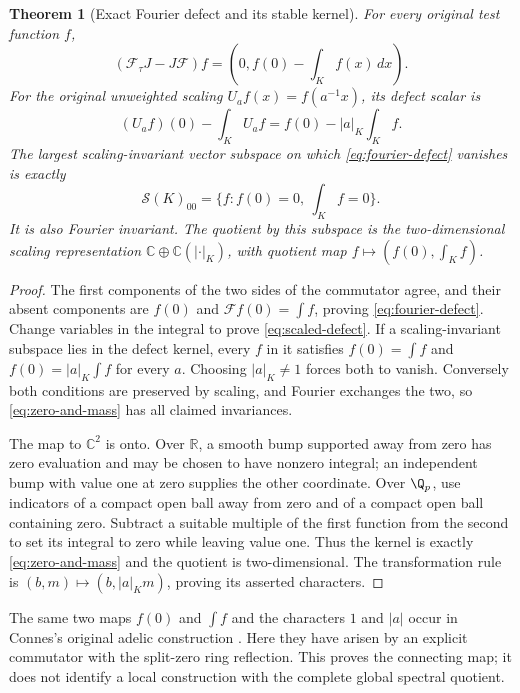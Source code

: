 \documentclass[11pt,a4paper]{article}
\newtheorem{theorem}{Theorem}[section]
\theoremstyle{definition}\newtheorem{definition}[theorem]{Definition}
\newcommand{\C}{\mathbb C}\newcommand{\R}{\mathbb R}
\newcommand{\Sch}{\mathcal S}\newcommand{\im}{\operatorname{im}}
\begin{document}
\begin{theorem}[Exact Fourier defect and its stable kernel]\label{thm:fourier-defect}
For every original test function $f$,
\begin{equation}\label{eq:fourier-defect}
 (\mathcal F_\tau J-J\mathcal F)f
 =\left(0,f(0)-\int_Kf(x)\,dx\right).
\end{equation}
For the original unweighted scaling $U_af(x)=f(a^{-1}x)$, its defect scalar is
\begin{equation}\label{eq:scaled-defect}
 (U_af)(0)-\int_KU_af=f(0)-|a|_K\int_Kf.
\end{equation}
The largest scaling-invariant vector subspace on which \eqref{eq:fourier-defect} vanishes is exactly
\begin{equation}\label{eq:zero-and-mass}
 \Sch(K)_{00}=\{f:f(0)=0,\ \int_Kf=0\}.
\end{equation}
It is also Fourier invariant. The quotient by this subspace is the two-dimensional scaling representation $\C\oplus\C(|\cdot|_K)$, with quotient map $f\mapsto(f(0),\int_Kf)$.
\end{theorem}
\begin{proof}
The first components of the two sides of the commutator agree, and their absent components are $f(0)$ and $\mathcal Ff(0)=\int f$, proving \eqref{eq:fourier-defect}. Change variables in the integral to prove \eqref{eq:scaled-defect}. If a scaling-invariant subspace lies in the defect kernel, every $f$ in it satisfies $f(0)=\int f$ and $f(0)=|a|_K\int f$ for every $a$. Choosing $|a|_K\ne1$ forces both to vanish. Conversely both conditions are preserved by scaling, and Fourier exchanges the two, so \eqref{eq:zero-and-mass} has all claimed invariances.

The map to $\C^2$ is onto. Over $\R$, a smooth bump supported away from zero has zero evaluation and may be chosen to have nonzero integral; an independent bump with value one at zero supplies the other coordinate. Over $\Q_p$, use indicators of a compact open ball away from zero and of a compact open ball containing zero. Subtract a suitable multiple of the first function from the second to set its integral to zero while leaving value one. Thus the kernel is exactly \eqref{eq:zero-and-mass} and the quotient is two-dimensional. The transformation rule is $(b,m)\mapsto(b,|a|_Km)$, proving its asserted characters.
\end{proof}

The same two maps $f(0)$ and $\int f$ and the characters $1$ and $|a|$ occur in Connes's original adelic construction \cite[Section III, (6)--(11)]{Connes1998}. Here they have arisen by an explicit commutator with the split-zero ring reflection. This proves the connecting map; it does not identify a local construction with the complete global spectral quotient.
\end{document}
